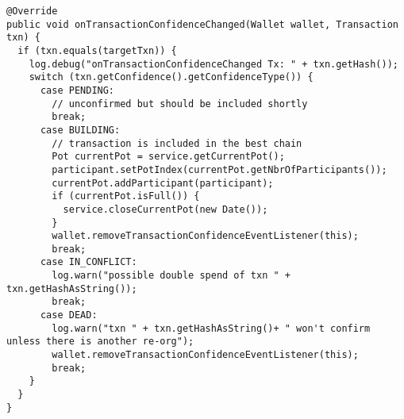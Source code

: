 \begin{lstlisting}[basicstyle=\small]
@Override
public void onTransactionConfidenceChanged(Wallet wallet, Transaction txn) {
  if (txn.equals(targetTxn)) {
    log.debug("onTransactionConfidenceChanged Tx: " + txn.getHash());
    switch (txn.getConfidence().getConfidenceType()) {
      case PENDING:
        // unconfirmed but should be included shortly
        break;
      case BUILDING:
        // transaction is included in the best chain
        Pot currentPot = service.getCurrentPot();
        participant.setPotIndex(currentPot.getNbrOfParticipants());
        currentPot.addParticipant(participant);
        if (currentPot.isFull()) {
          service.closeCurrentPot(new Date());
        }
        wallet.removeTransactionConfidenceEventListener(this);
        break;
      case IN_CONFLICT:
        log.warn("possible double spend of txn " + txn.getHashAsString());
        break;
      case DEAD:
        log.warn("txn " + txn.getHashAsString()+ " won't confirm unless there is another re-org");
        wallet.removeTransactionConfidenceEventListener(this);
        break;
    }
  }
}
\end{lstlisting}

